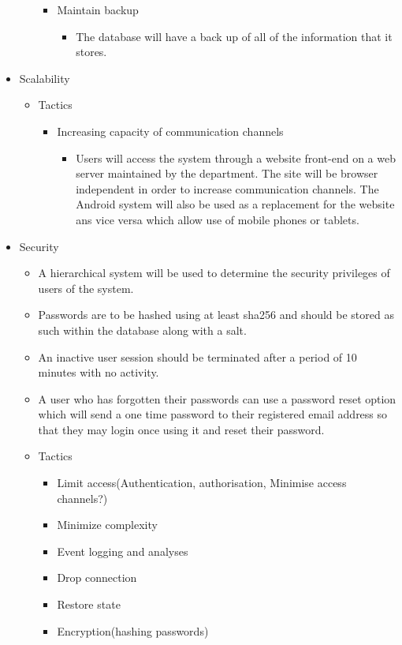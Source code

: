 \documentclass[a4paper,12pt]{article}
\begin{document}
\begin{itemize}
\begin{itemize}
\begin{itemize}
				\item Maintain backup
				
					\begin{itemize}
						\item The database will have a back up of all of the information that it stores.
					\end{itemize}
								

			\end{itemize}
						
		\end{itemize}
		\item Scalability
		\begin{itemize}
			
			\item Tactics
			\begin{itemize}

				\item Increasing capacity of communication channels
					
					\begin{itemize}
						\item Users will access the system through a website front-end on a web server maintained by the department. The site will be browser independent in order to increase communication channels. The Android system will also be used as a replacement for the website ans vice versa which allow use of mobile phones or tablets.
					\end{itemize}

			\end{itemize}
						
		\end{itemize}
		\item Security
		\begin{itemize}
			\item A hierarchical system will be used to determine the security privileges of users of the system.
			\item Passwords are to be hashed using at least sha256 and should be stored as such within the database along with a salt.
			\item An inactive user session should be terminated after a period of 10 minutes with no activity.
			\item A user who has forgotten their passwords can use a password reset option which will send a one time password to their registered email address so that they may login once using it and reset their password.
			
			\item Tactics
			\begin{itemize}
				\item Limit access(Authentication, authorisation, Minimise access channels?)
				\item Minimize complexity
				\item Event logging and analyses
				\item Drop connection
				\item Restore state
				\item Encryption(hashing passwords)
				

\end{itemize}
\end{itemize}
\end{itemize}
\end{document}

